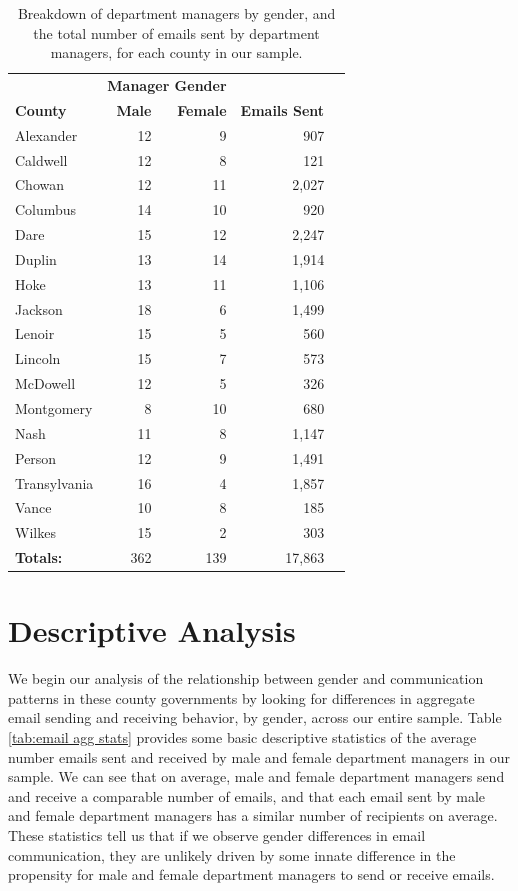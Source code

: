 \documentclass{pnastwo}
\begin{document}
\begin{article}
	\begin{table}
	\centering
		\begin{tabular}{lrrrr}
		  \toprule
		  & \multicolumn{2}{c}{\textbf{Manager Gender}} & \\
		  \cmidrule{2-3}
		 \textbf{County} & \textbf{Male} & \textbf{Female} & \textbf{Emails Sent}  \\
		  \midrule
		Alexander & 12 & 9 & 907   \\
		Caldwell & 12 & 8 & 121     \\
		Chowan & 12 & 11 & 2,027   \\
		Columbus & 14 & 10 & 920   \\
		Dare & 15 & 12 & 2,247    \\
		Duplin & 13 & 14 & 1,914    \\
		Hoke & 13 & 11 & 1,106  \\
		Jackson & 18 & 6 & 1,499    \\
		Lenoir & 15 & 5 & 560  \\
		Lincoln & 15 & 7 & 573   \\
		McDowell & 12 & 5 & 326   \\
		Montgomery & 8 & 10 & 680   \\
		Nash & 11 & 8 & 1,147  \\
		Person & 12 & 9 & 1,491   \\
		Transylvania & 16 & 4 & 1,857  \\
		Vance & 10 & 8 & 185   \\
		Wilkes & 15 & 2 & 303   \\
		   \midrule
		   \textbf{Totals:} & 362 & 139 & 17,863 \\
		   \bottomrule
		\end{tabular}
		\caption{\label{tab:county aggregate stats}Breakdown of department managers by gender, and the total number of emails sent by department managers, for each county in our sample.}
	\end{table}



\section{Descriptive Analysis}

We begin our analysis of the relationship between gender and communication patterns in these county governments by looking for differences in aggregate email sending and receiving behavior, by gender, across our entire sample. Table \ref{tab:email agg stats} provides some basic descriptive statistics of the average number emails sent and received by male and female department managers in our sample. We can see that on average, male and female department managers send and receive a comparable number of emails, and that each email sent by male and female department managers has a similar number of recipients on average. These statistics tell us that if we observe gender differences in email communication, they are unlikely driven by some innate difference in the propensity for male and female department managers to send or receive emails. 
	

\end{article}
\end{document}
